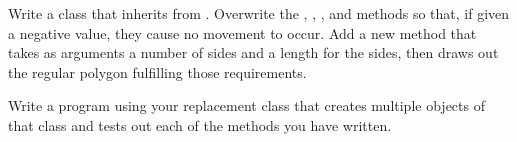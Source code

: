 \documentclass[11pt]{cselabheader}
\begin{document}
\begin{ex}[myturtle.py]
    Write a class that inherits from . Overwrite
    the , , ,
    and  methods so that, if given a negative value, they
    cause no movement to occur. Add a new method 
    that takes as arguments a number of sides and a length for the sides, then
    draws out the regular polygon fulfilling those requirements.

    Write a program using your replacement  class that
    creates multiple objects of that class and tests out each of the methods
    you have written.
\end{ex}

\end{document}
